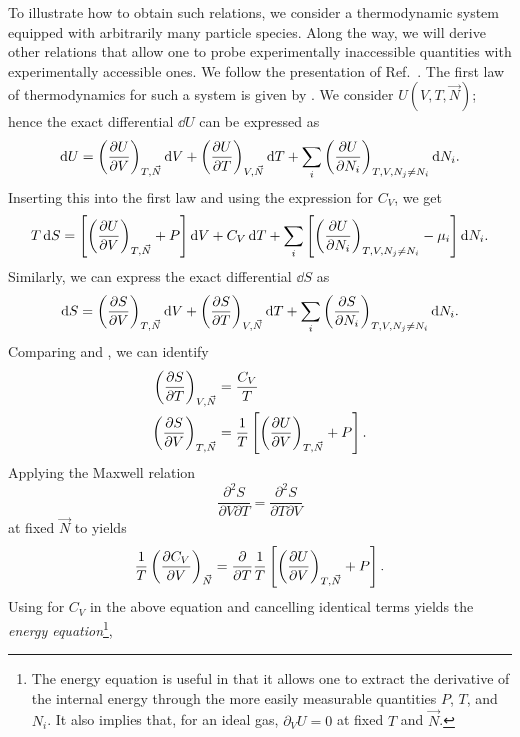 To illustrate how to obtain such relations, we consider 
a thermodynamic system equipped with arbitrarily many particle species. 
Along the way, we will derive other relations that allow one to probe
experimentally inaccessible quantities with experimentally accessible ones.
We follow the presentation of Ref.~\cite{huang_introduction_2001}.
The first law of thermodynamics for such a system is given by
. We consider $U(V,T,\vec{N})$; hence the exact differential 
$\dd U$ can be expressed as
\begin{equation}
\dd{U} = \left(\pdv{U}{V}\right)_{T,\vec{N}}\dd{V}
+ \left(\pdv{U}{T}\right)_{V,\vec{N}}\dd{T}
+ \sum_i \left(\pdv{U}{N_i}\right)_{T,V,N_j\neq N_i}\dd N_i.
\end{equation}
Inserting this into the first law and using the expression
 for $C_V$, we get
\begin{equation}\label{eq:maxDeriv1}
T\dd{S}=
\left[ \left(\pdv{U}{V}\right)_{T,\vec{N}} +P\right]\dd{V}
+ C_V \dd{T}
+ \sum_i \left[\left(\pdv{U}{N_i}\right)_{T,V,N_j\neq N_i}-\mu_i\right]\dd N_i.
\end{equation}
Similarly, we can express the exact differential $\dd{S}$ as
\begin{equation}\label{eq:maxDeriv2}
\dd{S} = \left(\pdv{S}{V}\right)_{T,\vec{N}}\dd{V}
+ \left(\pdv{S}{T}\right)_{V,\vec{N}}\dd{T}
+ \sum_i \left(\pdv{S}{N_i}\right)_{T,V,N_j\neq N_i}\dd N_i.
\end{equation}
Comparing  and ,
we can identify
\begin{equation}\begin{aligned}\label{eq:maxDeriv3}
\left(\pdv{S}{T}\right)_{V,\vec{N}}&=\frac{C_V}{T}\\
\left(\pdv{S}{V}\right)_{T,\vec{N}}&=
\frac{1}{T}\left[\left(\pdv{U}{V}\right)_{T,\vec{N}} +P\right].
\end{aligned}\end{equation}
Applying the Maxwell relation
\begin{equation}
\frac{\partial^2 S}{\partial V\partial T}
=\frac{\partial^2 S}{\partial T\partial V}
\end{equation}
at fixed $\vec{N}$ to  yields
\begin{equation}
\frac{1}{T}\left(\pdv{C_V}{V}\right)_{\vec{N}}=
\frac{\partial}{\partial T}
\frac{1}{T}\left[\left(\pdv{U}{V}\right)_{T,\vec{N}} +P\right].
\end{equation}
Using  for $C_V$ in the above equation and 
cancelling identical terms yields the {\it energy equation}\footnote{The energy equation is useful in that it allows one to
extract the derivative of the internal energy through the more easily measurable
quantities $P$, $T$, and $N_i$. It also implies that, for an ideal gas,
$\partial_V U=0$ at fixed $T$ and $\vec{N}$.},
